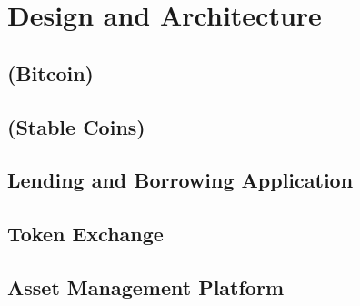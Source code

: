 \chapter{Design and Architecture}
\label{cha:DesignArchitecture}

\section{(Bitcoin)}
\section{(Stable Coins)}
\section{Lending and Borrowing Application}
\section{Token Exchange}
\section{Asset Management Platform}